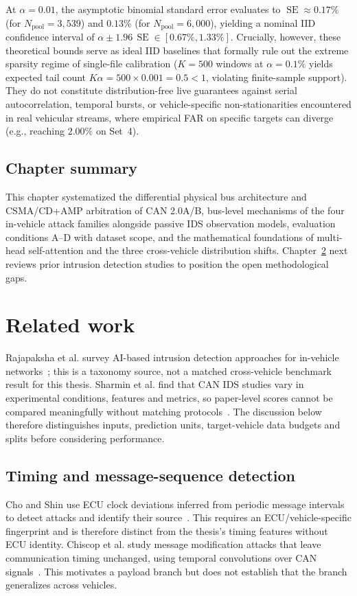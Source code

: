 \documentclass[12pt, a4paper, reqno, oneside]{book}
\begin{document}
\begin{enumerate}
\begin{equation}
    \end{equation}
    At $\alpha = 0.01$, the asymptotic binomial standard error evaluates to $\operatorname{SE} \approx 0.17\%$ (for $N_{\text{pool}} = 3{,}539$) and $0.13\%$ (for $N_{\text{pool}} = 6{,}000$), yielding a nominal IID confidence interval of $\alpha \pm 1.96\,\operatorname{SE} \in [0.67\%, 1.33\%]$. Crucially, however, these theoretical bounds serve as ideal IID baselines that formally rule out the extreme sparsity regime of single-file calibration ($K=500$ windows at $\alpha=0.1\%$ yields expected tail count $K\alpha = 500 \times 0.001 = 0.5 < 1$, violating finite-sample support). They do not constitute distribution-free live guarantees against serial autocorrelation, temporal bursts, or vehicle-specific non-stationarities encountered in real vehicular streams, where empirical FAR on specific targets can diverge (e.g., reaching $2.00\%$ on Set~4).
\end{enumerate}

\section{Chapter summary}
This chapter systematized the differential physical bus architecture and CSMA/CD+AMP arbitration of CAN 2.0A/B, bus-level mechanisms of the four in-vehicle attack families alongside passive IDS observation models, evaluation conditions A--D with dataset scope, and the mathematical foundations of multi-head self-attention and the three cross-vehicle distribution shifts. Chapter~\ref{chap:related} next reviews prior intrusion detection studies to position the open methodological gaps.

\chapter{Related work}\label{chap:related}
Rajapaksha et al. survey AI-based intrusion detection approaches for in-vehicle networks~\cite{rajapaksha2023survey}; this is a taxonomy source, not a matched cross-vehicle benchmark result for this thesis. Sharmin et al. find that CAN IDS studies vary in experimental conditions, features and metrics, so paper-level scores cannot be compared meaningfully without matching protocols~\cite{sharmin2024benchmark}. The discussion below therefore distinguishes inputs, prediction units, target-vehicle data budgets and splits before considering performance.

\section{Timing and message-sequence detection}
Cho and Shin use ECU clock deviations inferred from periodic message intervals to detect attacks and identify their source~\cite{cho2016fingerprint}. This requires an ECU/vehicle-specific fingerprint and is therefore distinct from the thesis's timing features without ECU identity. Chiscop et al. study message modification attacks that leave communication timing unchanged, using temporal convolutions over CAN signals~\cite{chiscop2021modification}. This motivates a payload branch but does not establish that the branch generalizes across vehicles.
\end{document}
